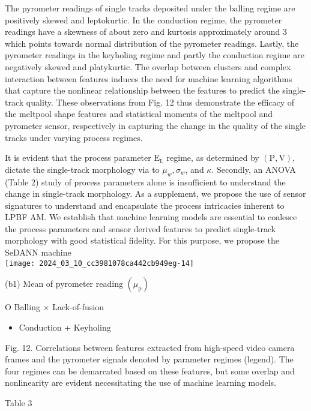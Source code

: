 \documentclass[10pt]{article}
\begin{document}
The pyrometer readings of single tracks deposited under the balling regime are positively skewed and leptokurtic. In the conduction regime, the pyrometer readings have a skewness of about zero and kurtosis approximately around 3 which points towards normal distribution of the pyrometer readings. Lastly, the pyrometer readings in the keyholing regime and partly the conduction regime are negatively skewed and platykurtic. The overlap between clusters and complex interaction between features induces the need for machine learning algorithms that capture the nonlinear relationship between the features to predict the single-track quality. These observations from Fig. 12 thus demonstrate the efficacy of the meltpool shape features and statistical moments of the meltpool and pyrometer sensor, respectively in capturing the change in the quality of the single tracks under varying process regimes.

It is evident that the process parameter $\mathrm{E}_{\mathrm{L}}$ regime, as determined by $(\mathrm{P}, \mathrm{V})$, dictate the single-track morphology via to $\mu_{w}, \sigma_{w}$, and $\kappa$. Secondly, an ANOVA (Table 2) study of process parameters alone is insufficient to understand the change in single-track morphology. As a supplement, we propose the use of sensor signatures to understand and encapsulate the process intricacies inherent to LPBF AM. We establish that machine learning models are essential to coalesce the process parameters and sensor derived features to predict single-track morphology with good statistical fidelity. For this purpose, we propose the SeDANN machine\\
\texttt{[image: 2024\_03\_10\_cc3981078ca442cb949eg-14]}

(b1) Mean of pyrometer reading $\left(\mu_{\mathrm{p}}\right)$

O Balling $\times$ Lack-of-fusion

\begin{itemize}
  \item Conduction + Keyholing
\end{itemize}

Fig. 12. Correlations between features extracted from high-speed video camera frames and the pyrometer signals denoted by parameter regimes (legend). The four regimes can be demarcated based on these features, but some overlap and nonlinearity are evident necessitating the use of machine learning models.

Table 3
\end{document}

